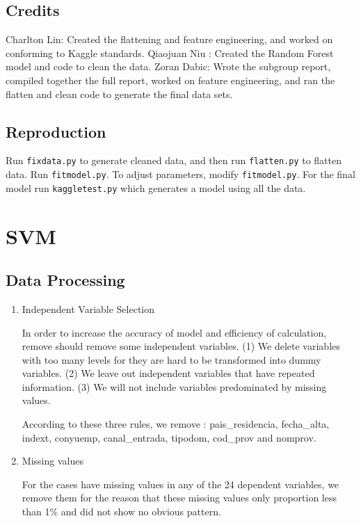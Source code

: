 \documentclass{article}
\begin{document}
\begin{spacing}{1}
\begin{large}
\subsection{Credits}

Charlton Lin: Created the flattening and feature engineering, and worked on conforming to Kaggle standards.
Qiaojuan Niu : Created the Random Forest model and code to clean the data.
Zoran Dabic: Wrote the subgroup report, compiled together the full report, worked on feature engineering, and ran the flatten and clean code to generate the final data sets.

\subsection{Reproduction}
Run \texttt{fixdata.py} to generate cleaned data, and then run \texttt{flatten.py} to flatten data. Run \texttt{fitmodel.py}. To adjust parameters, modify \texttt{fitmodel.py}. For the final model run \texttt{kaggletest.py} which generates a model using all the data.

\section{SVM}

\subsection{Data Processing}
\begin{enumerate}
	\item Independent Variable Selection

	In order to increase the accuracy of model and efficiency of calculation, remove should remove some independent variables. (1) We delete variables with too many levels for they are hard to be transformed into dummy variables. (2) We leave out independent variables that have repeated information. (3) We will not include  variables predominated by missing values.

	According to these three  rules, we remove : pais\_residencia, fecha\_alta, indext, conyuemp, canal\_entrada, tipodom, cod\_prov and nomprov.

	\item  Missing values

	For the cases have missing values in any of the 24 dependent variables, we remove them for the reason that these missing values only proportion less than 1\% and did not show no obvious pattern.


\end{enumerate}
\end{large}
\end{spacing}
\end{document}
